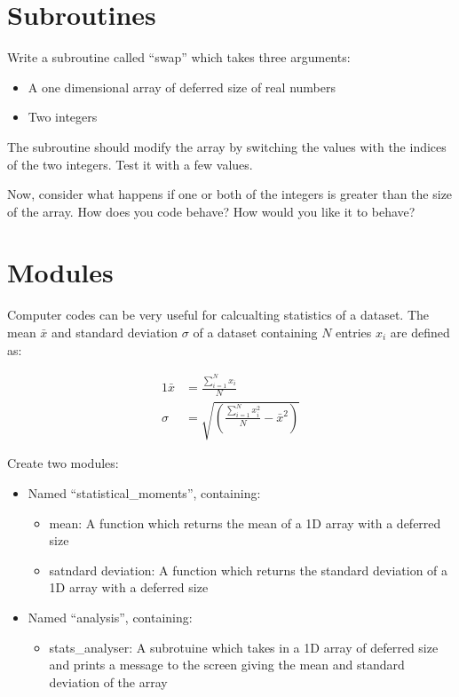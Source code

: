\documentclass[11pt,a4paper]{article}
\begin{document}
\section{Subroutines}
Write a subroutine called ``swap'' which takes three arguments:

\begin{itemize}
    \item A one dimensional array of deferred size of real numbers
    \item Two integers
\end {itemize}

The subroutine should modify the array by switching the values with the indices of the two integers. Test it with a few values.

Now, consider what happens if one or both of the integers is greater than the size of the array. How does you code behave? How would you like it to behave?


\section{Modules}
Computer codes can be very useful for calcualting statistics of a dataset. The mean $\bar{x}$ and standard deviation $\sigma$ of a dataset containing $N$ entries $x_{i}$ are defined as:

\begin{alignat}{1}
    \bar{x} & = \frac{\sum\limits_{i=1}^{N} x_{i}}{N} \\
    \sigma &= \sqrt{\left(\frac{\sum\limits_{i=1}^{N} x_{i}^{2}}{N}-\bar{x}^{2}\right)}
\end{alignat}

Create two modules:
\begin{itemize}
    \item Named ``statistical\_moments'', containing:
    \begin{itemize}
        \item mean: A function which returns the mean of a 1D array with a deferred size
        \item satndard deviation: A function which returns the standard deviation of a 1D array with a deferred size
    \end{itemize}
    \item Named ``analysis'', containing:
    \begin{itemize}
        \item stats\_analyser: A subrotuine which takes in a 1D array of deferred size and prints a message to the screen giving the mean and standard deviation of the array
    \end{itemize}
\end{itemize}
\end{document}

